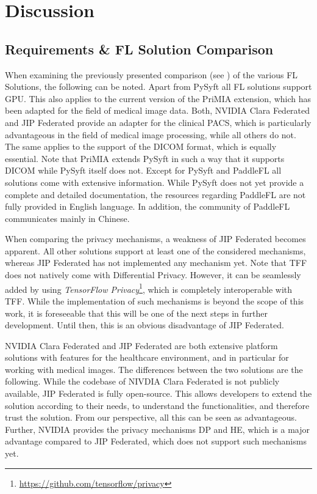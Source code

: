 \section{Discussion}
\label{sec:Discussion}

\subsection{Requirements \& FL Solution Comparison}
\label{subsec:DiscussionRequirements}

When examining the previously presented comparison (see ) of the various FL Solutions, the following can be noted.
Apart from PySyft all FL solutions support GPU. This also applies to the current version of the PriMIA extension, which has been adapted for the field of medical image data.
Both, NVIDIA Clara Federated and JIP Federated provide an adapter for the clinical PACS, which is particularly advantageous in the field of medical image processing, while all others do not. The same applies to the support of the DICOM format, which is equally essential.
Note that PriMIA extends PySyft in such a way that it supports DICOM while PySyft itself does not.
Except for PySyft and PaddleFL all solutions come with extensive information. While PySyft does not yet provide a complete and detailed documentation, the resources regarding PaddleFL are not fully provided in English language. In addition, the community of PaddleFL communicates mainly in Chinese.

When comparing the privacy mechanisms, a weakness of JIP Federated becomes apparent. All other solutions support at least one of the considered mechanisms, whereas JIP Federated has not implemented any mechanism yet.
Note that TFF does not natively come with Differential Privacy. However, it can be seamlessly added by using \textit{TensorFlow Privacy}\footnote{\url{https://github.com/tensorflow/privacy}}, which is completely interoperable with TFF.
While the implementation of such mechanisms is beyond the scope of this work, it is foreseeable that this will be one of the next steps in further development. %
Until then, this is an obvious disadvantage of JIP Federated.

NVIDIA Clara Federated and JIP Federated are both extensive platform solutions with features for the healthcare environment, and in particular for working with medical images.
The differences between the two solutions are the following. While the codebase of NIVDIA Clara Federated is not publicly available, JIP Federated is fully open-source. This allows developers to extend the solution according to their needs, to understand the functionalities, and therefore trust the solution.
From our perspective, all this can be seen as advantageous.
Further, NVIDIA provides the privacy mechanisms DP and HE, which is a major advantage compared to JIP Federated, which does not support such mechanisms yet.


